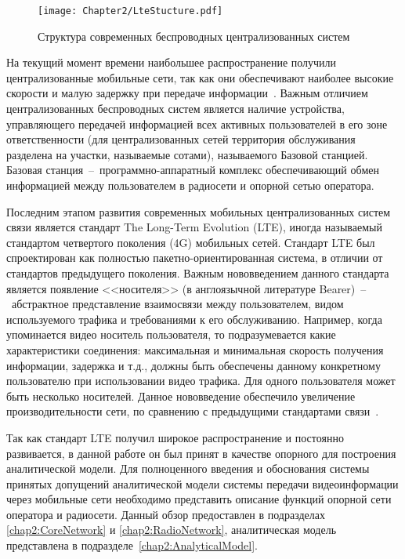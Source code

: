\begin{figure}[htbp]
\begin{center}
\texttt{[image: Chapter2/LteStucture.pdf]}
\caption{Структура современных беспроводных централизованных систем}
\label{fig:LteStructure}
\end{center}
\end{figure}

На текущий момент времени наибольшее распространение получили централизованные мобильные сети, так как они обеспечивают наиболее высокие скорости и малую задержку при передаче информации~\cite{Cisco}. Важным отличием централизованных беспроводных систем является наличие устройства, управляющего передачей информацией всех активных пользователей в его зоне ответственности (для централизованных сетей территория обслуживания разделена на участки, называемые сотами), называемого Базовой станцией. Базовая станция~--~программно-аппаратный комплекс обеспечивающий обмен информацией между пользователем в радиосети и опорной сетью оператора.

Последним этапом развития современных мобильных централизованных систем связи является стандарт The Long-Term Evolution (LTE), иногда называемый стандартом четвертого поколения (4G) мобильных сетей. Стандарт LTE был спроектирован как полностью пакетно-ориентированная система, в отличии от стандартов предыдущего поколения. Важным нововведением данного стандарта является появление <<носителя>> (в англоязычной литературе Bearer)~--~абстрактное представление взаимосвязи между пользователем, видом используемого трафика и требованиями к его обслуживанию. Например, когда упоминается видео носитель пользователя, то подразумевается какие характеристики соединения: максимальная и минимальная скорость получения информации, задержка и т.д., должны быть обеспечены данному конкретному пользователю при использовании видео трафика. Для одного пользователя может быть несколько носителей. Данное нововведение обеспечило увеличение производительности сети, по сравнению с предыдущими стандартами связи~\cite{opac-b1130916}.

Так как стандарт LTE получил широкое распространение и постоянно развивается, в данной работе он был принят в качестве опорного для построения аналитической модели. Для полноценного введения и обоснования системы принятых допущений аналитической модели системы передачи видеоинформации через мобильные сети необходимо представить описание функций опорной сети оператора и радиосети. Данный обзор предоставлен в подразделах \ref{chap2:CoreNetwork} и \ref{chap2:RadioNetwork}, аналитическая модель представлена в подразделе~\ref{chap2:AnalyticalModel}.


